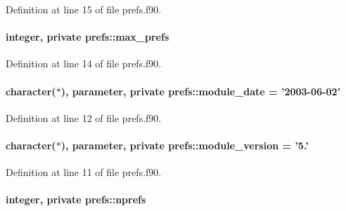 Definition at line 15 of file prefs.\-f90.

\hypertarget{classprefs_ac12163b65e6c96eb7f3506534cf091cc}{
\paragraph[{max\-\_\-prefs}]{\setlength{\rightskip}{0pt plus 5cm}integer, private prefs\-::max\-\_\-prefs\hspace{0.3cm}{\ttfamily [private]}}}\label{classprefs_ac12163b65e6c96eb7f3506534cf091cc}


Definition at line 14 of file prefs.\-f90.

\hypertarget{classprefs_af7026defbec1b9911edcde14c353a552}{
\paragraph[{module\-\_\-date}]{\setlength{\rightskip}{0pt plus 5cm}character($\ast$), parameter, private prefs\-::module\-\_\-date = '2003-\/06-\/02'\hspace{0.3cm}{\ttfamily [private]}}}\label{classprefs_af7026defbec1b9911edcde14c353a552}


Definition at line 12 of file prefs.\-f90.

\hypertarget{classprefs_ad2051574c1463f3afbaa9e30a3d5e949}{
\paragraph[{module\-\_\-version}]{\setlength{\rightskip}{0pt plus 5cm}character($\ast$), parameter, private prefs\-::module\-\_\-version = '5.'\hspace{0.3cm}{\ttfamily [private]}}}\label{classprefs_ad2051574c1463f3afbaa9e30a3d5e949}


Definition at line 11 of file prefs.\-f90.

\hypertarget{classprefs_a0ae14163593a41361d0245ccea2a8e9c}{
\paragraph[{nprefs}]{\setlength{\rightskip}{0pt plus 5cm}integer, private prefs\-::nprefs\hspace{0.3cm}{\ttfamily [private]}}}\label{classprefs_a0ae14163593a41361d0245ccea2a8e9c}


